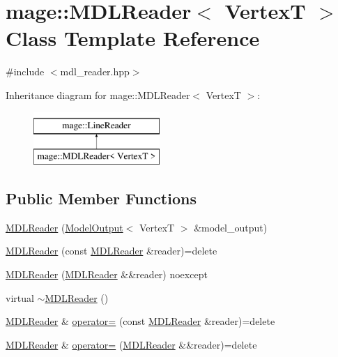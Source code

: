 \hypertarget{classmage_1_1_m_d_l_reader}{}\section{mage\+:\+:M\+D\+L\+Reader$<$ VertexT $>$ Class Template Reference}
\label{classmage_1_1_m_d_l_reader}


{\ttfamily \#include $<$mdl\+\_\+reader.\+hpp$>$}

Inheritance diagram for mage\+:\+:M\+D\+L\+Reader$<$ VertexT $>$\+:\begin{figure}[H]
\begin{center}
\leavevmode
\includegraphics[height=2.000000cm]{classmage_1_1_m_d_l_reader}
\end{center}
\end{figure}
\subsection*{Public Member Functions}
\begin{DoxyCompactItemize}
\item 
\hyperlink{classmage_1_1_m_d_l_reader_a068ed8c9101b42033ea166ab7aa03c04}{M\+D\+L\+Reader} (\hyperlink{structmage_1_1_model_output}{Model\+Output}$<$ VertexT $>$ \&model\+\_\+output)
\item 
\hyperlink{classmage_1_1_m_d_l_reader_ae7b3ee7b2b02101da041249e98f31bcc}{M\+D\+L\+Reader} (const \hyperlink{classmage_1_1_m_d_l_reader}{M\+D\+L\+Reader} \&reader)=delete
\item 
\hyperlink{classmage_1_1_m_d_l_reader_af907c05c1c347250169b1e07287e30fe}{M\+D\+L\+Reader} (\hyperlink{classmage_1_1_m_d_l_reader}{M\+D\+L\+Reader} \&\&reader) noexcept
\item 
virtual \hyperlink{classmage_1_1_m_d_l_reader_ae1e784f0c7449a2a34ffb90badc3d2da}{$\sim$\+M\+D\+L\+Reader} ()
\item 
\hyperlink{classmage_1_1_m_d_l_reader}{M\+D\+L\+Reader} \& \hyperlink{classmage_1_1_m_d_l_reader_a8cc5e9966283f3f9727fa28a75412ddb}{operator=} (const \hyperlink{classmage_1_1_m_d_l_reader}{M\+D\+L\+Reader} \&reader)=delete
\item 
\hyperlink{classmage_1_1_m_d_l_reader}{M\+D\+L\+Reader} \& \hyperlink{classmage_1_1_m_d_l_reader_a993c23d2e7f16f22a28e48ae9b7173b4}{operator=} (\hyperlink{classmage_1_1_m_d_l_reader}{M\+D\+L\+Reader} \&\&reader)=delete
\end{DoxyCompactItemize}
